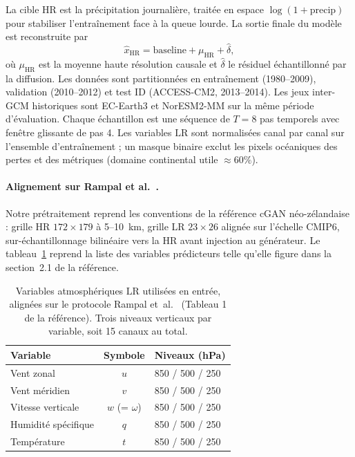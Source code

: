 \documentclass[14pt,a4paper,openany]{extreport}
\newcommand{\HR}{\ensuremath{\text{HR}}}
\newcommand{\LR}{\ensuremath{\text{LR}}}
\newcommand{\muHR}{\ensuremath{\mu_{\HR}}}
\begin{document}
La cible \HR{} est la précipitation journalière, traitée en espace $\log(1 + \mathrm{precip})$ pour stabiliser l'entraînement face à la queue lourde. La sortie finale du modèle est reconstruite par
\begin{equation}
  \widehat{x}_{\HR} = \mathrm{baseline} + \muHR + \widehat{\delta},
  \label{eq:exp-decomp}
\end{equation}
où $\muHR$ est la moyenne haute résolution causale et $\widehat{\delta}$ le résiduel échantillonné par la diffusion. Les données sont partitionnées en entraînement (1980--2009), validation (2010--2012) et test ID (ACCESS-CM2, 2013--2014). Les jeux inter-GCM historiques sont EC-Earth3 et NorESM2-MM sur la même période d'évaluation. Chaque échantillon est une séquence de $T = 8$ pas temporels avec fenêtre glissante de pas 4. Les variables \LR{} sont normalisées canal par canal sur l'ensemble d'entraînement ; un masque binaire exclut les pixels océaniques des pertes et des métriques (domaine continental utile $\approx 60\%$).

\paragraph{Alignement sur Rampal et al.~\cite{rampal_cgan_2024}.} Notre prétraitement reprend les conventions de la référence cGAN néo-zélandaise : grille HR $172 \times 179$ à 5--10~km, grille LR $23 \times 26$ alignée sur l'échelle CMIP6, sur-échantillonnage bilinéaire vers la HR avant injection au générateur. Le tableau~\ref{tab:exp-data-rampal} reprend la liste des variables prédicteurs telle qu'elle figure dans la section~2.1 de la référence.

\begin{table}[ht]
  \centering
  \small
  \caption[Variables LR utilisées]{Variables atmosphériques \LR{} utilisées en entrée, alignées sur le protocole Rampal et~al.~\cite{rampal_cgan_2024} (Tableau 1 de la référence). Trois niveaux verticaux par variable, soit 15 canaux au total.}
  \label{tab:exp-data-rampal}
  \begin{tabular}{l c l}
    \toprule
    \textbf{Variable} & \textbf{Symbole} & \textbf{Niveaux (hPa)} \\
    \midrule
    Vent zonal & $u$ & 850 / 500 / 250 \\
    Vent méridien & $v$ & 850 / 500 / 250 \\
    Vitesse verticale & $w$ (= $\omega$) & 850 / 500 / 250 \\
    Humidité spécifique & $q$ & 850 / 500 / 250 \\
    Température & $t$ & 850 / 500 / 250 \\
    \bottomrule
  \end{tabular}
\end{table}
\end{document}
